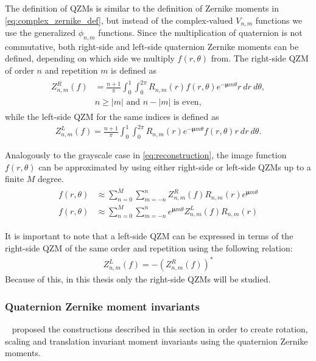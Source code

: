 The definition of QZMs is similar to the definition of Zernike moments in \eqref{eq:complex_zernike_def}, but instead of the complex-valued $V_{n,m}$ functions we use the generalized $\phi_{n,m}$ functions. Since the multiplication of quaternion is not commutative, both right-side and left-side quaternion Zernike moments can be defined, depending on which side we multiply $f(r,\theta)$ from. The right-side QZM of order $n$ and repetition $m$ is defined as
\begin{gather}
    \begin{split}
    Z_{n,m}^R(f) &= \frac{n + 1}{\pi}\int_0^1\int_0^{2\pi}R_{n,m}(r)f(r,\theta)e^{-\bm{\mu}m\theta}r\ dr\ d\theta, \\
    &n \geq |m| \text{  and  } n - |m| \text{  is even,}
    \end{split}
    \label{eq:QZRM}
\end{gather}
while the left-side QZM for the same indices is defined as 
\begin{gather*}
Z_{n,m}^L(f) = \frac{n + 1}{\pi}\int_0^1\int_0^{2\pi}R_{n,m}(r)e^{-\bm{\mu}m\theta}f(r,\theta)r\ dr\ d\theta.
\end{gather*}


Analogously to the grayscale case in \eqref{eq:reconstruction}, the image function $f(r,\theta)$ can be approximated by using either right-side or left-side QZMs up to a finite $M$ degree. 
\begin{gather}
    \begin{split}
      f(r,\theta) &\approx \sum_{n=0}^{M}\sum_{m=-n}^{n}Z_{n,m}^R(f)R_{n,m}(r)e^{\bm{\mu}m\theta} \\
      f(r,\theta) &\approx \sum_{n=0}^{M}\sum_{m=-n}^{n}e^{\bm{\mu}m\theta}Z_{n,m}^L(f)R_{n,m}(r)
    \end{split}\label{eq:qzm_reconstruction}
\end{gather}


It is important to note that a left-side QZM can be expressed in terms of the right-side QZM of the same order and repetition using the following relation:
\begin{gather*}
    Z_{n,m}^L(f) = -(Z_{n,m}^R(f))^{*}
\end{gather*}
Because of this, in this thesis only the right-side QZMs will be studied.

\subsubsection{Quaternion Zernike moment invariants}\label{sec:invariance}
\citeauthor{qzmi}~\cite{qzm, qzmi} proposed the constructions described in this section in order to create rotation, scaling and translation invariant moment invariants using the quaternion Zernike moments.

